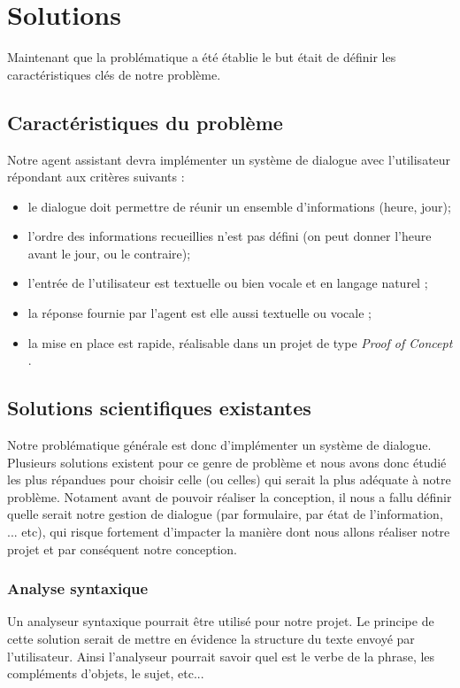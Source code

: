\chapter{Solutions}

Maintenant que la problématique a été établie le but était de définir les caractéristiques clés de notre problème.


\section{Caractéristiques du problème}
Notre agent assistant devra implémenter un système de dialogue avec l'utilisateur répondant aux critères suivants :
\begin{itemize}
	\item le dialogue doit permettre de réunir un ensemble d'informations (heure, jour);
 	\item l'ordre des informations recueillies n'est pas défini (on peut donner l'heure avant le jour, ou le contraire);
 	\item l'entrée de l'utilisateur est textuelle ou bien vocale et en langage naturel ;
 	\item la réponse fournie par l'agent est elle aussi textuelle ou vocale ;
 	\item la mise en place est rapide, réalisable dans un projet de type \og \textit{Proof of Concept} \fg.
\end{itemize}

\section{Solutions scientifiques existantes}
Notre problématique générale est donc d'implémenter un système de dialogue. Plusieurs solutions existent pour ce genre de problème et nous avons donc étudié les plus répandues pour choisir celle (ou celles) qui serait la plus adéquate à notre problème. Notament avant de pouvoir réaliser la conception, il nous a fallu définir quelle serait notre gestion de dialogue (par formulaire, par état de l'information, ... etc), qui risque fortement d'impacter la manière dont nous allons réaliser notre projet et par conséquent notre conception.

\subsection{Analyse syntaxique}
Un analyseur syntaxique pourrait être utilisé pour notre projet. Le principe de cette solution serait de mettre en évidence la structure du texte envoyé par l'utilisateur. Ainsi l'analyseur pourrait savoir quel est le verbe de la phrase, les compléments d'objets, le sujet, etc... 

